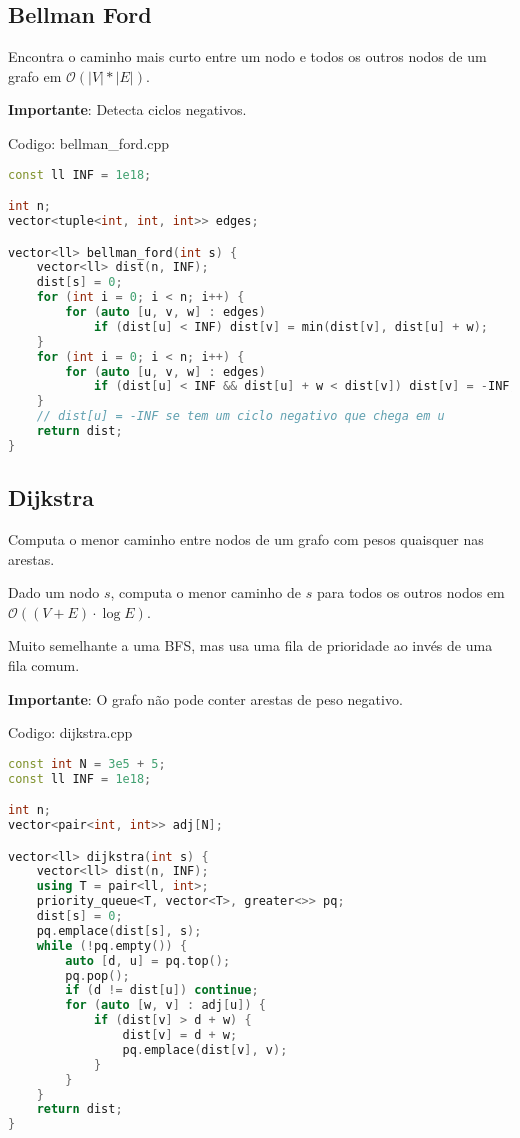 \documentclass[10pt, a4paper, oneside]{book}
\begin{document}
\subsection{Bellman Ford}


Encontra o caminho mais curto entre um nodo e todos os outros nodos de um grafo em $\mathcal{O}(|V| * |E|)$.



\textbf{Importante}: Detecta ciclos negativos.

\hfill

Codigo: bellman\_ford.cpp

\begin{lstlisting}[language=C++]
const ll INF = 1e18;

int n;
vector<tuple<int, int, int>> edges;

vector<ll> bellman_ford(int s) {
    vector<ll> dist(n, INF);
    dist[s] = 0;
    for (int i = 0; i < n; i++) {
        for (auto [u, v, w] : edges)
            if (dist[u] < INF) dist[v] = min(dist[v], dist[u] + w);
    }
    for (int i = 0; i < n; i++) {
        for (auto [u, v, w] : edges)
            if (dist[u] < INF && dist[u] + w < dist[v]) dist[v] = -INF;
    }
    // dist[u] = -INF se tem um ciclo negativo que chega em u
    return dist;
}
\end{lstlisting}
\hfill

\subsection{Dijkstra}


Computa o menor caminho entre nodos de um grafo com pesos quaisquer nas arestas.



Dado um nodo $s$, computa o menor caminho de $s$ para todos os outros nodos em $\mathcal{O}((V + E) \cdot \log E)$.



Muito semelhante a uma BFS, mas usa uma fila de prioridade ao invés de uma fila comum.



\textbf{Importante}: O grafo não pode conter arestas de peso negativo.
\hfill

Codigo: dijkstra.cpp

\begin{lstlisting}[language=C++]
const int N = 3e5 + 5;
const ll INF = 1e18;

int n;
vector<pair<int, int>> adj[N];

vector<ll> dijkstra(int s) {
    vector<ll> dist(n, INF);
    using T = pair<ll, int>;
    priority_queue<T, vector<T>, greater<>> pq;
    dist[s] = 0;
    pq.emplace(dist[s], s);
    while (!pq.empty()) {
        auto [d, u] = pq.top();
        pq.pop();
        if (d != dist[u]) continue;
        for (auto [w, v] : adj[u]) {
            if (dist[v] > d + w) {
                dist[v] = d + w;
                pq.emplace(dist[v], v);
            }
        }
    }
    return dist;
}
\end{lstlisting}
\hfill
\end{document}
